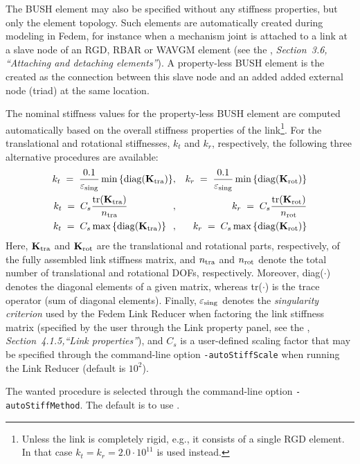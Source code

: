 The BUSH element may also be specified without any stiffness properties,
but only the element topology.
Such elements are automatically created during modeling in Fedem,
for instance when a mechanism joint is attached to a link at a slave node of an
RGD, RBAR or WAVGM element (see the \FedemUG, {\em Section~3.6,
``Attaching and detaching elements''}).
A property-less BUSH element is the created as the connection between this slave
node and an added added external node (triad) at the same location.

The nominal stiffness values for the property-less BUSH element are computed
automatically based on the overall stiffness properties of the link\footnote{
Unless the link is completely rigid, e.g., it consists of a single RGD element.
In that case $k_t = k_r = 2.0 \cdot 10^{11}$ is used instead.}.
For the translational and rotational stiffnesses, $k_t$ and $k_r$, respectively,
the following three alternative procedures are available:
%
\begin{eqnarray}
k_t \;=\; \frac{0.1}{\varepsilon_{\rm sing}}
          \min\left\{{\rm diag}({\bf K}_{\rm tra})\right\} &,&
k_r \;=\; \frac{0.1}{\varepsilon_{\rm sing}}
          \min\left\{{\rm diag}({\bf K}_{\rm rot})\right\} \\
%
k_t \;=\; C_s \frac{{\rm tr}({\bf K}_{\rm tra})}{n_{\rm tra}} \hskip47pt &,&
k_r \;=\; C_s \frac{{\rm tr}({\bf K}_{\rm rot})}{n_{\rm rot}} \\
%
k_t \;=\; C_s \max\left\{{\rm diag}({\bf K}_{\rm tra})\right\} \hskip7pt &,&
k_r \;=\; C_s \max\left\{{\rm diag}({\bf K}_{\rm rot})\right\} \label{eq:defB}
\end{eqnarray}
%
Here, ${\bf K}_{\rm tra}$ and ${\bf K}_{\rm rot}$ are the translational and
rotational parts, respectively, of the fully assembled link stiffness matrix,
and $n_{\rm tra}$ and $n_{\rm rot}$ denote the total number of translational
and rotational DOFs, respectively.
Moreover, diag($\cdot$) denotes the diagonal elements of a given matrix,
whereas tr($\cdot$) is the trace operator (sum of diagonal elements).
Finally, $\varepsilon_{\rm sing}$ denotes the {\em singularity criterion}
used by the Fedem Link Reducer when factoring the link stiffness matrix
(specified by the user through the Link property panel,
see the \FedemUG, {\em Section~4.1.5,``Link properties''}),
and $C_s$ is a user-defined scaling factor that may be specified through the
command-line option {\tt -autoStiffScale} when running the Link Reducer
(default is $10^2$).

The wanted procedure is selected through the command-line option
{\tt -autoStiffMethod}.
The default is to use .
